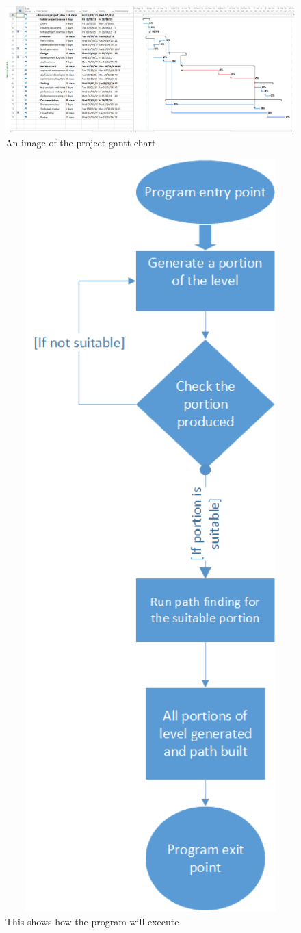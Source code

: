 \begin{landscape}
\begin{figure}[ht!]
	\includegraphics[width=1.5\textwidth]{images/project-plan}
	\caption{An image of the project gantt chart	 \label{gantt}}
\end{figure}
\end{landscape}



\begin{figure}[ht!]
	\includegraphics[width=1.0\textwidth, height =1.4\textwidth]{images/block-diagram}
	\caption{This shows how the program will execute	\label{block}}
\end{figure}





